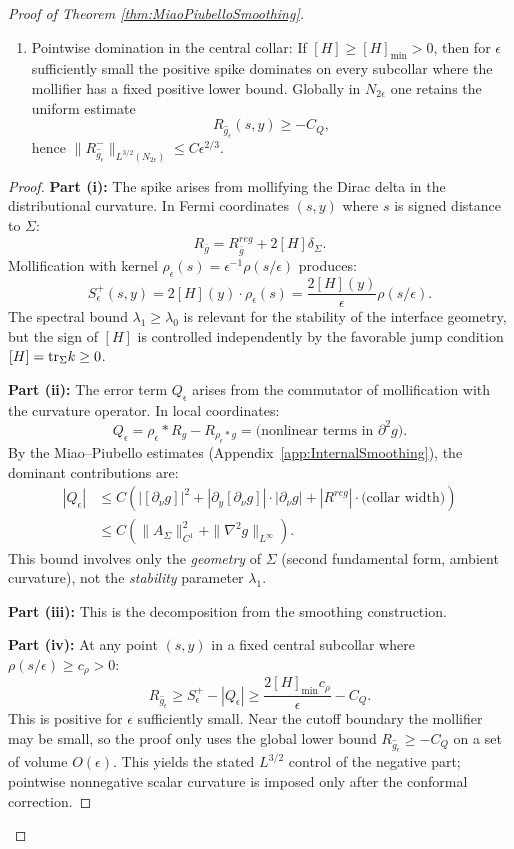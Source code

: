 \begin{proof}[Proof of Theorem \ref{thm:MiaoPiubelloSmoothing}]
\begin{lemma}
\begin{enumerate}
    \item[(iv)] Pointwise domination in the central collar: If $[H] \ge [H]_{\min} > 0$, then for $\epsilon$ sufficiently small the positive spike dominates on every subcollar where the mollifier has a fixed positive lower bound. Globally in $N_{2\epsilon}$ one retains the uniform estimate
    \[
        R_{\hat{g}_\epsilon}(s, y) \ge -C_Q,
    \]
    hence $\|R^-_{\hat g_\epsilon}\|_{L^{3/2}(N_{2\epsilon})}\le C\epsilon^{2/3}$.
\end{enumerate}
\end{lemma}

\begin{proof}
\textbf{Part (i):} The spike arises from mollifying the Dirac delta in the distributional curvature. In Fermi coordinates $(s, y)$ where $s$ is signed distance to $\Sigma$:
\[
    R_{\bar{g}} = R^{reg}_{\bar{g}} + 2[H] \delta_\Sigma.
\]
Mollification with kernel $\rho_\epsilon(s) = \epsilon^{-1}\rho(s/\epsilon)$ produces:
\[
    S^+_\epsilon(s, y) = 2[H](y) \cdot \rho_\epsilon(s) = \frac{2[H](y)}{\epsilon} \rho(s/\epsilon).
\]
The spectral bound $\lambda_1 \ge \lambda_0$ is relevant for the stability of the interface geometry, but the sign of $[H]$ is controlled independently by the favorable jump condition $[H]=\mathrm{tr}_\Sigma k \ge 0$.

\textbf{Part (ii):} The error term $Q_\epsilon$ arises from the commutator of mollification with the curvature operator. In local coordinates:
\[
    Q_\epsilon = \rho_\epsilon * R_g - R_{\rho_\epsilon * g} = \text{(nonlinear terms in } \partial^2 g \text{)}.
\]
By the Miao--Piubello estimates (Appendix~\ref{app:InternalSmoothing}), the dominant contributions are:
\begin{align}
    |Q_\epsilon| &\le C \left( |[\partial_\nu g]|^2 + |\partial_y [\partial_\nu g]| \cdot |\partial_\nu g| + |R^{reg}| \cdot \text{(collar width)} \right) \\
    &\le C \left( \|A_\Sigma\|_{C^1}^2 + \|\nabla^2 g\|_{L^\infty} \right).
\end{align}
This bound involves only the \emph{geometry} of $\Sigma$ (second fundamental form, ambient curvature), not the \emph{stability} parameter $\lambda_1$.

\textbf{Part (iii):} This is the decomposition from the smoothing construction.

\textbf{Part (iv):} At any point $(s, y)$ in a fixed central subcollar where $\rho(s/\epsilon)\ge c_\rho>0$:
\[
    R_{\hat{g}_\epsilon} \ge S^+_\epsilon - |Q_\epsilon| \ge \frac{2[H]_{\min}c_\rho}{\epsilon} - C_Q.
\]
This is positive for $\epsilon$ sufficiently small. Near the cutoff boundary the mollifier may be small, so the proof only uses the global lower bound $R_{\hat g_\epsilon}\ge -C_Q$ on a set of volume $O(\epsilon)$. This yields the stated $L^{3/2}$ control of the negative part; pointwise nonnegative scalar curvature is imposed only after the conformal correction.
\end{proof}


\end{proof}

